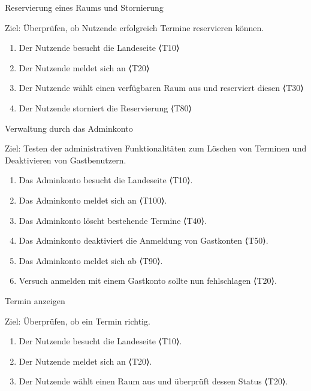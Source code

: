 \pagebreak

\begin{scenario}{20}{Reservierung eines Raums und Stornierung}
  \item[Ziel:] Überprüfen, ob Nutzende erfolgreich Termine reservieren können.
  \begin{enumerate}
    \item Der Nutzende besucht die Landeseite ⟨T10⟩
    \item Der Nutzende meldet sich an ⟨T20⟩
    \item Der Nutzende wählt einen verfügbaren Raum aus und reserviert diesen ⟨T30⟩
    \item Der Nutzende storniert die Reservierung ⟨T80⟩
  \end{enumerate}
\end{scenario}

\begin{scenario}{30}{Verwaltung durch das Adminkonto}
  \item[Ziel:] Testen der administrativen Funktionalitäten zum Löschen von Terminen und Deaktivieren von Gastbenutzern.
  \begin{enumerate}
    \item Das Adminkonto besucht die Landeseite ⟨T10⟩.
    \item Das Adminkonto meldet sich an ⟨T100⟩.
    \item Das Adminkonto löscht bestehende Termine ⟨T40⟩.
    \item Das Adminkonto deaktiviert die Anmeldung von Gastkonten ⟨T50⟩.
    \item Das Adminkonto meldet sich ab ⟨T90⟩.
    \item Versuch anmelden mit einem Gastkonto sollte nun fehlschlagen ⟨T20⟩.
  \end{enumerate}
\end{scenario}

\begin{scenario}{40}{Termin anzeigen}
  \item[Ziel:] Überprüfen, ob ein Termin richtig.
  \begin{enumerate}
    \item Der Nutzende besucht die Landeseite ⟨T10⟩.
    \item Der Nutzende meldet sich an ⟨T20⟩.
    \item Der Nutzende wählt einen Raum aus und überprüft dessen Status ⟨T20⟩.
  \end{enumerate}
\end{scenario}







